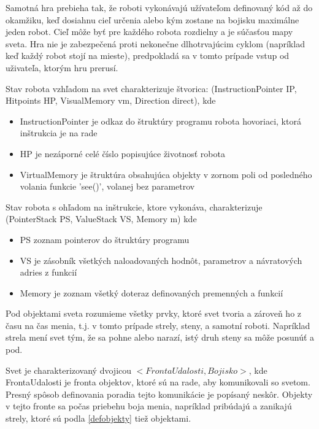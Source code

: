Samotná hra prebieha tak, že roboti vykonávajú užívateľom definovaný kód až do okamžiku, keď dosiahnu cieľ určenia alebo kým zostane na bojisku maximálne jeden robot. Cieľ môže byť pre každého robota rozdielny a je súčasťou mapy sveta. Hra nie je zabezpečená proti nekonečne dlhotrvajúcim cyklom (napríklad keď každý robot stojí na mieste), predpokladá sa v tomto prípade vstup od uživateľa, ktorým hru prerusí.

\begin{definicia}
Stav robota vzhľadom na svet charakterizuje štvorica: (InstructionPointer IP, Hitpoints HP, VisualMemory vm, Direction direct), kde 
\begin{itemize}
\item InstructionPointer je odkaz do štruktúry programu robota hovoriaci, ktorá inštrukcia je na rade
\item HP je nezáporné celé číslo popisujúce životnosť robota
\item VirtualMemory je štruktúra obsahujúca objekty v zornom poli od posledného volania funkcie 'see()', volanej bez parametrov 
\end{itemize}
Stav robota s ohľadom na inštrukcie, ktore vykonáva, charakterizuje (PointerStack PS, ValueStack VS, Memory m) kde
\begin{itemize}
\item PS zoznam pointerov do štruktúry programu
\item VS je zásobník všetkých naloadovaných hodnôt, parametrov  a návratových adries z funkcií
\item Memory je zoznam všetký doteraz definovaných premenných a funkcií
\end{itemize}
\label{StavRobota}
\end{definicia}

\begin{definicia} 
Pod objektami sveta rozumieme všetky prvky, ktoré svet tvoria a zároveň ho z času na čas menia, t.j. v tomto prípade strely, steny, a samotní roboti. Napríklad strela mení svet tým, že sa pohne alebo narazí, istý druh steny sa môže posunúť a pod.
\end{definicia}
Svet je charakterizovaný dvojicou $< FrontaUdalosti, Bojisko >$, kde FrontaUdalosti je fronta objektov, ktoré sú na rade, aby komunikovali so svetom. Presný spôsob definovania poradia tejto komunikácie je popísaný neskôr. Objekty v tejto fronte sa počas priebehu boja menia, napríklad pribúdajú a zanikajú strely, ktoré sú podla \ref{defobjekty} tiež objektami.

